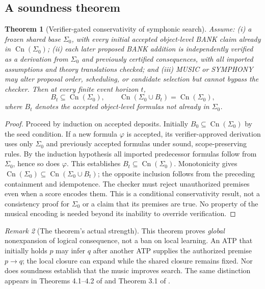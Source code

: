 \documentclass[11pt,letterpaper]{article}
\newtheorem{theorem}{Theorem}[section]
\theoremstyle{definition}
\theoremstyle{remark}
\newtheorem{remark}[theorem]{Remark}
\newcommand{\Cn}{\operatorname{Cn}}
\begin{document}
\subsection{A soundness theorem}
\begin{theorem}[Verifier-gated conservativity of symphonic search]\label{thm:sound}
Assume: (i) a frozen shared base $\Sigma_0$, with every initial accepted object-level BANK claim already in $\Cn(\Sigma_0)$; (ii) each later proposed BANK addition is independently verified as a derivation from $\Sigma_0$ and previously certified consequences, with all imported assumptions and theory translations checked; and (iii) MUSIC or SYMPHONY may alter proposal order, scheduling, or candidate selection but cannot bypass the checker. Then at every finite event horizon $t$,
\begin{equation}\label{eq:conservation}
B_t\subseteq\Cn(\Sigma_0),\qquad
\Cn(\Sigma_0\cup B_t)=\Cn(\Sigma_0),
\end{equation}
where $B_t$ denotes the accepted object-level formulas not already in $\Sigma_0$.
\end{theorem}
\begin{proof}
Proceed by induction on accepted deposits. Initially $B_0\subseteq\Cn(\Sigma_0)$ by the seed condition. If a new formula $\varphi$ is accepted, its verifier-approved derivation uses only $\Sigma_0$ and previously accepted formulas under sound, scope-preserving rules. By the induction hypothesis all imported predecessor formulas follow from $\Sigma_0$, hence so does $\varphi$. This establishes $B_t\subseteq\Cn(\Sigma_0)$. Monotonicity gives $\Cn(\Sigma_0)\subseteq\Cn(\Sigma_0\cup B_t)$; the opposite inclusion follows from the preceding containment and idempotence. The checker must reject unauthorized premises even when a score encodes them. This is a conditional conservativity result, not a consistency proof for $\Sigma_0$ or a claim that its premises are true. No property of the musical encoding is needed beyond its inability to override verification.
\end{proof}

\begin{remark}[The theorem's actual strength]
This theorem proves \emph{global} nonexpansion of logical consequence, not a ban on local learning. An ATP that initially holds $p$ may infer $q$ after another ATP supplies the authorized premise $p\to q$; the local closure can expand while the shared closure remains fixed. Nor does soundness establish that the music improves search. The same distinction appears in Theorems 4.1--4.2 of \cite{tenneson-dreaming} and Theorem 3.1 of \cite{tenneson-wcf}.
\end{remark}
\end{document}
